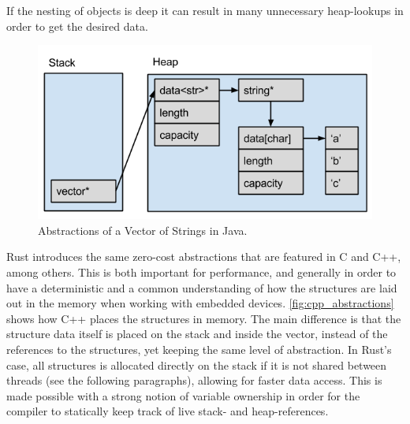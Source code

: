 If the nesting of objects is deep it can result in many unnecessary heap-lookups in order to get the desired data.

\begin{figure}[tb]
  \begin{center}
    \includegraphics[scale=0.5]{figures/java_abstractions}
  \end{center}
  \caption{Abstractions of a Vector of Strings in Java.}
  \label{fig:java_abstractions}
\end{figure}

Rust introduces the same zero-cost abstractions that are featured in C and C++, among others.
This is both important for performance, and generally in order to have a deterministic and a common understanding of how the structures are laid out in the memory when working with embedded devices.
\autoref{fig:cpp_abstractions} shows how C++ places the structures in memory.
The main difference is that the structure data itself is placed on the stack and inside the vector, instead of the references to the structures, yet keeping the same level of abstraction.
In Rust's case, all structures is allocated directly on the stack if it is not shared between threads (see the following paragraphs), allowing for faster data access.
This is made possible with a strong notion of variable ownership in order for the compiler to statically keep track of live stack- and heap-references.

